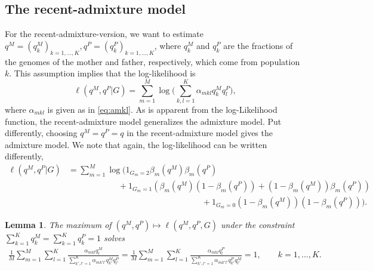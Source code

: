\documentclass[12pt]{article}
\newtheorem{lemma}{Lemma}[section]
\theoremstyle{definition}
\begin{document}
\subsection{The recent-admixture model}
\noindent
For the recent-admixture-version, we want to estimate
$q^M=(q^M_{k})_{k=1,...,K}, q^P=(q^P_{k})_{k=1,...,K}$, where
$q^M_{k}$ and $q^P_k$ are the fractions of the genomes of the mother
and father, respectively, which come from population $k$.  This
assumption implies that the log-likelihood is
$$ \ell(q^M, q^P|G) = \sum_{m=1}^M  \log\Big(\sum_{k,l=1}^K \alpha_{mkl}q_{k}^M q_l^P\Big),$$
where $\alpha_{mkl}$ is given as in \eqref{eq:amkl}.  As is apparent
from the log-Likelihood function, the recent-admixture model
generalizes the admixture model. Put differently, choosing
$q^M = q^P = q$ in the recent-admixture model gives the admixture
model. We note that again, the log-likelihood can be written
differently,
\begin{equation}
  \begin{aligned}\label{eqSI:logLrecentadmixture}
    \ell(q^M, q^P|G) & = \sum_{m=1}^M  \log\Big( 1_{G_m=2} \beta_m(q^M) \beta_m(q^P)
    \\ & \qquad \qquad \qquad + 1_{G_m=1}(\beta_m(q^M) (1-\beta_m(q^P))
    + (1-\beta_m(q^M)) \beta_m(q^P))
    \\ & \qquad \qquad \qquad \qquad \qquad \qquad \qquad \qquad + 1_{G_m=0}(1-\beta_m(q^M))(1-\beta_m(q^P))\Big).    
  \end{aligned}
\end{equation}

\begin{lemma}\label{l2}
  The maximum of $(q^M, q^P)\mapsto \ell(q^M, q^P,G)$ under the
  constraint $\sum_{k=1}^K q_k^M = \sum_{k=1}^K q_k^P = 1$ solves
  \begin{align}\label{eq:0recent}
    \frac{1}{M}\sum_{m=1}^M \sum_{l=1}^K  \frac{\alpha_{mkl}q_l^M}{\sum_{k',l'=1}^K \alpha_{mk'l'}q^M_{k'}q^P_{l'}}
    = \frac{1}{M}\sum_{m=1}^M \sum_{l=1}^K\frac{\alpha_{mkl}q_l^P}{\sum_{k',l'=1}^K \alpha_{mk'l'}q^P_{k'}q^M_{l'}} = 1, \qquad k=1,...,K.
  \end{align}
\end{lemma}
\end{document}
